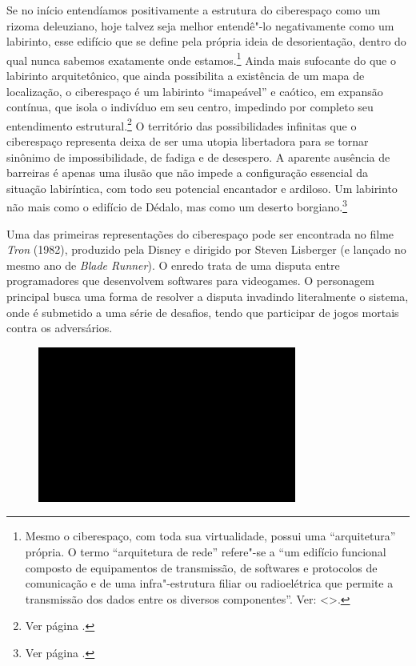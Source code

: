 Se no início entendíamos positivamente a estrutura do ciberespaço como
um rizoma deleuziano, hoje talvez seja melhor entendê"-lo
negativamente como um labirinto, esse edifício que se define pela
própria ideia de desorientação, dentro do qual nunca sabemos exatamente
onde estamos.\footnote{Mesmo o ciberespaço, com toda sua virtualidade,
  possui uma ``arquitetura'' própria. O termo ``arquitetura de rede''
  refere"-se a ``um edifício funcional composto de equipamentos de
  transmissão, de softwares e protocolos de comunicação e de uma
  infra"-estrutura filiar ou radioelétrica que permite a transmissão dos
  dados entre os diversos componentes''. Ver: \textless{}{}\textgreater{}.} Ainda
mais sufocante do que o labirinto arquitetônico, que ainda possibilita a
existência de um mapa de localização, o ciberespaço é um labirinto ``imapeável'' e
caótico, em expansão contínua, que isola o indivíduo em seu
centro, impedindo por completo seu entendimento estrutural.\footnote{Ver
  página \pageref{labirinto}.} O território das possibilidades infinitas que o
ciberespaço representa deixa de ser uma utopia libertadora para se
tornar sinônimo de impossibilidade, de fadiga e de desespero. A aparente ausência
de barreiras é apenas uma ilusão que não impede a configuração
essencial da situação labiríntica, com todo seu potencial encantador e
ardiloso. Um labirinto não mais como o edifício de Dédalo, mas como um
deserto borgiano.\footnote{Ver página \pageref{borges}.}

Uma das primeiras representações do ciberespaço pode ser encontrada no
filme \emph{Tron} (1982), produzido pela Disney e dirigido por Steven
Lisberger (e lançado no mesmo ano de \emph{Blade Runner}). O enredo
trata de uma disputa entre programadores que desenvolvem softwares para
videogames. O personagem principal busca uma forma de resolver a disputa
invadindo literalmente o sistema, onde é submetido a uma série de
desafios, tendo que participar de jogos mortais contra os adversários.

\begin{figure}[!ht]

\centering
 \includegraphics[width=85mm]{./imgs/im1.jpg}
\caption{\tiny{}}

\end{figure}

